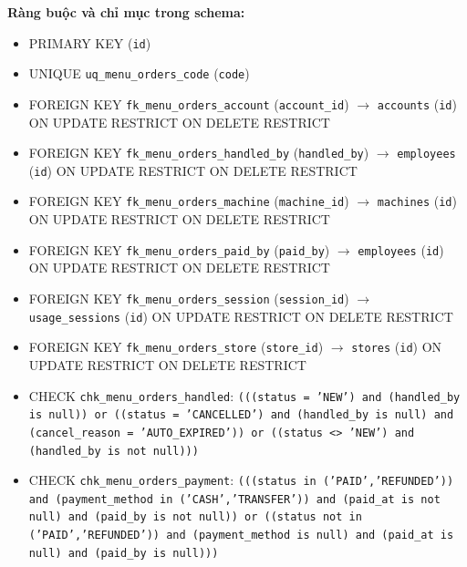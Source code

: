 \textbf{Ràng buộc và chỉ mục trong schema:}

\begin{itemize}

\item PRIMARY KEY (\texttt{id})

\item UNIQUE \texttt{uq\_menu\_orders\_code} (\texttt{code})

\item FOREIGN KEY \texttt{fk\_menu\_orders\_account} (\texttt{account\_id}) $\rightarrow$ \texttt{accounts} (\texttt{id}) ON UPDATE RESTRICT ON DELETE RESTRICT

\item FOREIGN KEY \texttt{fk\_menu\_orders\_handled\_by} (\texttt{handled\_by}) $\rightarrow$ \texttt{employees} (\texttt{id}) ON UPDATE RESTRICT ON DELETE RESTRICT

\item FOREIGN KEY \texttt{fk\_menu\_orders\_machine} (\texttt{machine\_id}) $\rightarrow$ \texttt{machines} (\texttt{id}) ON UPDATE RESTRICT ON DELETE RESTRICT

\item FOREIGN KEY \texttt{fk\_menu\_orders\_paid\_by} (\texttt{paid\_by}) $\rightarrow$ \texttt{employees} (\texttt{id}) ON UPDATE RESTRICT ON DELETE RESTRICT

\item FOREIGN KEY \texttt{fk\_menu\_orders\_session} (\texttt{session\_id}) $\rightarrow$ \texttt{usage\_sessions} (\texttt{id}) ON UPDATE RESTRICT ON DELETE RESTRICT

\item FOREIGN KEY \texttt{fk\_menu\_orders\_store} (\texttt{store\_id}) $\rightarrow$ \texttt{stores} (\texttt{id}) ON UPDATE RESTRICT ON DELETE RESTRICT

\item CHECK \texttt{chk\_menu\_orders\_handled}: \texttt{(((status = 'NEW') and (handled\_by is null)) or ((status = 'CANCELLED') and (handled\_by is null) and (cancel\_reason = 'AUTO\_EXPIRED')) or ((status <> 'NEW') and (handled\_by is not null)))}

\item CHECK \texttt{chk\_menu\_orders\_payment}: \texttt{(((status in ('PAID','REFUNDED')) and (payment\_method in ('CASH','TRANSFER')) and (paid\_at is not null) and (paid\_by is not null)) or ((status not in ('PAID','REFUNDED')) and (payment\_method is null) and (paid\_at is null) and (paid\_by is null)))}


\end{itemize}
